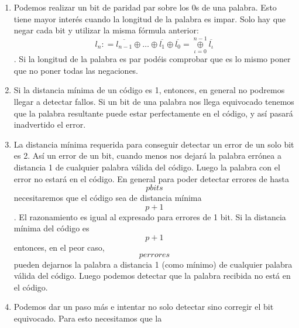 \documentclass[
]{article}
\begin{document}
\begin{enumerate}
\begin{enumerate}
\begin{enumerate}
\begin{enumerate}
        fórmula funciona es sencilla, si recordamos que
        \[a \oplus {a = 0}\] y que \[a \oplus {0 = a}\]. Así, para un
        código de un solo bit, el de paridad sería simple\-mente la
        repetición del bit (el bit de paridad par sería simplemente del
        mismo va\-lor que el ya existente). De esta forma lo dos bits
        son iguales y el número de 1s será o 0 o 2, esto es, siempre
        par. Si fuese el código original de 2 bits de longitud, el bit
        de paridad debería de valer 1 si solo uno de los dos (no los
        dos) valiese 1. Esto vuelve a ser la suma exclusiva. Y así
        sucesivamente.
      \item
        Podemos realizar un bit de paridad par sobre los 0s de una
        palabra. Esto tiene mayor interés cuando la longitud de la
        palabra es impar. Solo hay que negar cada bit y utilizar la
        misma fórmula anterior:
        \[l_{n}{: = \overline{l_{n-1}}} \oplus \ldots \oplus \overline{l_{1}} \oplus {\overline{l_{0}} = \underset{\iota = 0}{\overset{n - 1}{\oplus}}}\overline{l_{\iota}}\].
        Si la lon\-gitud de la palabra es par podéis comprobar que es lo
        mismo poner que no poner todas las negaciones.
      \item
        Si la distancia mínima de un código es 1, entonces, en general
        no podremos lle\-gar a detectar fallos. Si un bit de una palabra
        nos llega equivocado tenemos que la palabra resultante puede
        estar perfectamente en el código, y así pasará inadvertido el
        error.
      \item
        La distancia mínima requerida para conseguir detectar un error
        de un solo bit es 2. Así un error de un bit, cuando menos nos
        dejará la palabra errónea a distancia 1 de cualquier palabra
        válida del código. Luego la palabra con el error no estará en el
        código. En general para poder detectar errores de hasta
        \[p\mathit{bits}\]necesitaremos que el código sea de distancia
        mínima \[p + 1\]. El razonamiento es igual al expre\-sado para
        errores de 1 bit. Si la distancia mínima del código es
        \[p + 1\]entonces, en el peor caso, \[p\mathit{errores}\]pueden
        dejarnos la palabra a distancia 1 (como míni\-mo) de cualquier
        palabra válida del código. Luego podemos detectar que la
        pala\-bra recibida no está en el código.
      \item
        Podemos dar un paso más e intentar no solo detectar sino
        corregir el bit equivo\-cado. Para esto necesitamos que la

\end{enumerate}
\end{enumerate}
\end{enumerate}
\end{enumerate}
\end{document}
